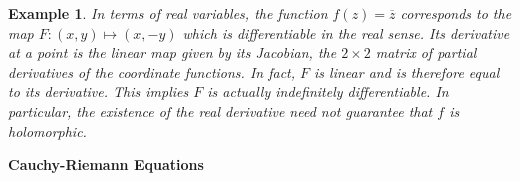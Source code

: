 \documentclass{article}
\newtheorem*{example}{Example}
\theoremstyle{definition}
\theoremstyle{remark}
\begin{document}
    \begin{example}
        In terms of real variables, the function $f(z) = \overline{z}$ corresponds to the map $F: (x,y) \mapsto (x,-y)$ which is
        differentiable in the real sense. Its derivative at a point is the linear map given by its Jacobian, the $2\times 2$ matrix
        of partial derivatives of the coordinate functions. In fact, $F$ is linear and is therefore equal to its derivative. 
        This implies $F$ is actually indefinitely differentiable. In particular, the existence of the real derivative need 
        not guarantee that $f$ is holomorphic.
    \end{example}

    \newpage

    \textbf{Cauchy-Riemann Equations}\\
\end{document}

